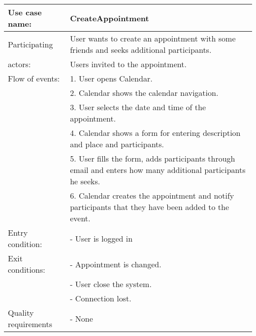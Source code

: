 {\tabulinesep=1.2mm
\begin{tabu}{ | p{3cm} | p{13cm} |}
    \hline
    Use case name: 			& 		CreateAppointment\\ \hline
    Participating  			& 		User wants to create an appointment with some friends and seeks additional participants. \\
    actors:					&		Users invited to the appointment.\\ \hline
    Flow of events: 		& 		1. User opens Calendar. \\
							&		2. Calendar shows the calendar navigation.\\
							&		3. User selects the date and time of the appointment.\\
							&		4. Calendar shows a form for entering description and place and participants.\\
							&		5. User fills the form, adds participants through email and enters how many additional participants he seeks.\\
							&		6. Calendar creates the appointment and notify participants that they have been added to the event.\\ \hline
    Entry condition: 		& 		- User is logged in  \\ \hline
	Exit conditions: 		&		- Appointment is changed.\\
							&		- User close the system.\\
							&		- Connection lost.\\\hline
	Quality requirements	&	 	- None \\\hline
\end{tabu}
}
